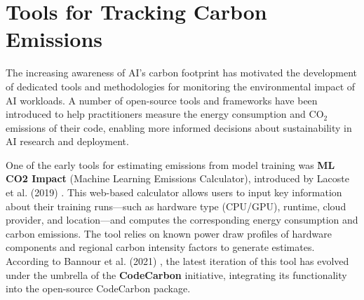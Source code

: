 \documentclass[a4paper,singleside,12pt]{report} %
\begin{document}
\section{Tools for Tracking Carbon Emissions}

The increasing awareness of AI’s carbon footprint has motivated the development of dedicated tools and methodologies for monitoring 
the environmental impact of AI workloads. A number of open-source tools and frameworks have been introduced to help practitioners 
measure the energy consumption and $\mathrm{CO_2}$ emissions of their code, enabling more informed decisions about sustainability 
in AI research and deployment.

One of the early tools for estimating emissions from model training was \textbf{ML CO2 Impact} (Machine Learning 
Emissions Calculator), introduced by Lacoste et al. (2019) \cite{lacoste2019quantifying}. This web-based calculator allows users 
to input key information about their training runs—such as hardware type (CPU/GPU), runtime, cloud provider, and location—and 
computes the corresponding energy consumption and carbon emissions. The tool relies on known power draw profiles of hardware 
components and regional carbon intensity factors to generate estimates. According to Bannour et al. (2021) 
\cite{bannour-etal-2021-evaluating}, the latest iteration of this tool has evolved under the umbrella of the \textbf{CodeCarbon} 
initiative, integrating its functionality into the open-source CodeCarbon package.
\end{document}
